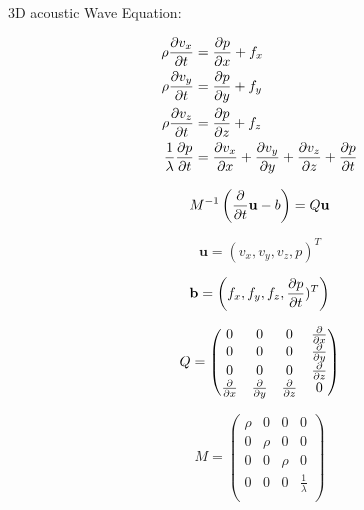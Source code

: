 \documentclass[pdftex,a4paper,parskip,listof=totoc,bibliography=totoc,onehalfspacing,12pt]{scrreprt}
\begin{document}
3D acoustic Wave Equation:

\begin{align}
\rho\pdv{v_x}{t}&=\pdv{p}{x}+ f_x\\
\rho\pdv{v_y}{t}&=\pdv{p}{y} + f_y\\
\rho\pdv{v_z}{t}&=\pdv{p}{z} + f_z\\
\frac{1}{\lambda}\pdv{p}{t} &= \pdv{v_x}{x} +  \pdv{v_y}{y} + \pdv{v_z}{z} + \pdv{p}{t}\\
\end{align}

\begin{equation}
 M^{-1}\left( \pdv{}{t}\mathbf{u}-b \right) =Q\mathbf{u}
\end{equation}

\begin{equation}
\mathbf{u}=\left(v_x,v_y,v_z,p \right)^T
\end{equation}

\begin{equation}
\mathbf{b}=\left(f_x,f_y,f_z,\pdv{p}{t})^T\right)
\end{equation}

\begin{equation}
Q=
 \begin{pmatrix}
   0         & 0         & 0         & \pdv{}{x}\\
   0         & 0         & 0         & \pdv{}{y}\\
   0         & 0         & 0         & \pdv{}{z}\\
   \pdv{}{x} & \pdv{}{y} & \pdv{}{z} & 0        \\

 \end{pmatrix}
\end{equation}

\begin{equation}
M=
 \begin{pmatrix}
   \rho       & 0         & 0         & 0                \\
   0          & \rho      & 0         & 0                \\
   0          & 0         & \rho      & 0                \\
   0          & 0         & 0         & \frac{1}{\lambda}\\
 \end{pmatrix}
\end{equation}

\vspace{0.3cm}
\end{document}
